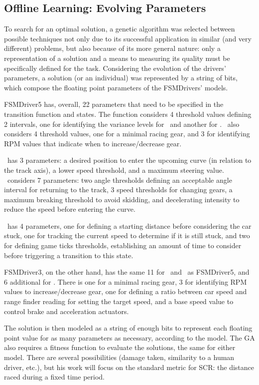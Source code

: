 \subsection{Offline Learning: Evolving Parameters}%
To search for an optimal solution, a genetic algorithm was selected between possible techniques not only due to its successful application in similar (and very different) problems, but also because of its more general nature: only a representation of a solution and a means to measuring its quality must be specifically defined for the task. Considering the evolution of the drivers' parameters, a solution (or an individual) was represented by a string of bits, which compose the floating point parameters of the FSMDrivers' models.

FSMDriver5 has, overall, 22 parameters that need to be specified in the transition function and states. The function considers 4 threshold values defining 2 intervals, one for identifying the variance levels for \SL~and another for \AC. \SL~also considers 4 threshold values, one for a minimal racing gear, and 3 for identifying RPM values that indicate when to increase/decrease gear.

\AC~has 3 parameters: a desired position to enter the upcoming curve (in relation to the track axis), a lower speed threshold, and a maximum steering value. \OT~considers 7 parameters: two angle thresholds defining an acceptable angle interval for returning to the track, 3 speed thresholds for changing gears, a maximum breaking threshold to avoid skidding, and decelerating intensity to reduce the speed before entering the curve.

\St~has 4 parameters, one for defining a starting distance before considering the car stuck, one for tracking the current speed to determine if it is still stuck, and two for defining game ticks thresholds, establishing an amount of time to consider before triggering a transition to this state.

FSMDriver3, on the other hand, has the same 11 for \OT~and \St~as FSMDriver5, and 6 additional for \IT. There is one for a minimal racing gear, 3 for identifying RPM values to increase/decrease gear, one for defining a ratio between car speed and range finder reading for setting the target speed, and a base speed value to control brake and acceleration actuators.

The solution is then modeled as a string of enough bits to represent each floating point value for as many parameters as necessary, according to the model. The GA also requires a fitness function to evaluate the solutions, the same for either model. There are several possibilities (damage taken, similarity to a human driver, etc.), but his work will focus on the standard metric for SCR: the distance raced during a fixed time period.



